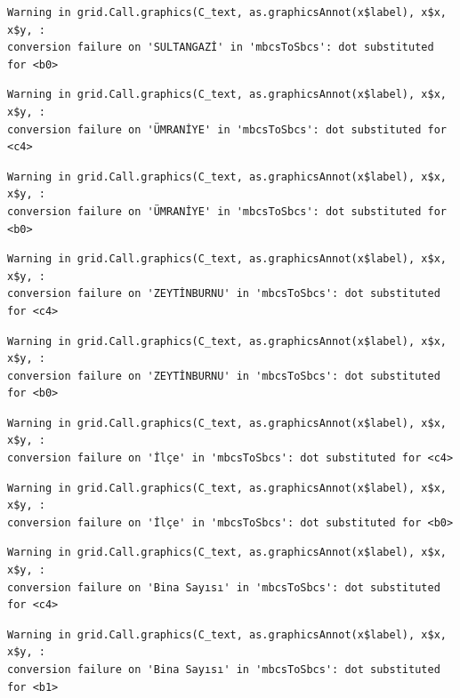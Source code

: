 \documentclass[
  11pt,
  a4paper,
  DIV=11,
  numbers=noendperiod]{scrartcl}
\begin{document}
\begin{verbatim}
Warning in grid.Call.graphics(C_text, as.graphicsAnnot(x$label), x$x, x$y, :
conversion failure on 'SULTANGAZİ' in 'mbcsToSbcs': dot substituted for <b0>
\end{verbatim}

\begin{verbatim}
Warning in grid.Call.graphics(C_text, as.graphicsAnnot(x$label), x$x, x$y, :
conversion failure on 'ÜMRANİYE' in 'mbcsToSbcs': dot substituted for <c4>
\end{verbatim}

\begin{verbatim}
Warning in grid.Call.graphics(C_text, as.graphicsAnnot(x$label), x$x, x$y, :
conversion failure on 'ÜMRANİYE' in 'mbcsToSbcs': dot substituted for <b0>
\end{verbatim}

\begin{verbatim}
Warning in grid.Call.graphics(C_text, as.graphicsAnnot(x$label), x$x, x$y, :
conversion failure on 'ZEYTİNBURNU' in 'mbcsToSbcs': dot substituted for <c4>
\end{verbatim}

\begin{verbatim}
Warning in grid.Call.graphics(C_text, as.graphicsAnnot(x$label), x$x, x$y, :
conversion failure on 'ZEYTİNBURNU' in 'mbcsToSbcs': dot substituted for <b0>
\end{verbatim}

\begin{verbatim}
Warning in grid.Call.graphics(C_text, as.graphicsAnnot(x$label), x$x, x$y, :
conversion failure on 'İlçe' in 'mbcsToSbcs': dot substituted for <c4>
\end{verbatim}

\begin{verbatim}
Warning in grid.Call.graphics(C_text, as.graphicsAnnot(x$label), x$x, x$y, :
conversion failure on 'İlçe' in 'mbcsToSbcs': dot substituted for <b0>
\end{verbatim}

\begin{verbatim}
Warning in grid.Call.graphics(C_text, as.graphicsAnnot(x$label), x$x, x$y, :
conversion failure on 'Bina Sayısı' in 'mbcsToSbcs': dot substituted for <c4>
\end{verbatim}

\begin{verbatim}
Warning in grid.Call.graphics(C_text, as.graphicsAnnot(x$label), x$x, x$y, :
conversion failure on 'Bina Sayısı' in 'mbcsToSbcs': dot substituted for <b1>
\end{verbatim}
\end{document}
